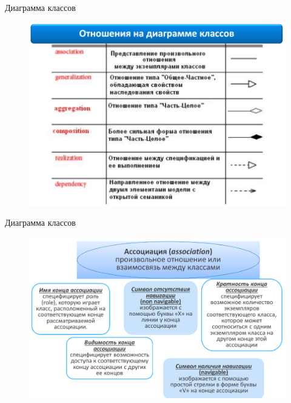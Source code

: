 \documentclass{beamer}
\begin{document}
\begin{frame}[t]{Диаграмма классов}
\begin{figure}[h]
\centering
\includegraphics[scale=0.45]{images/lec03-pic23.png}
\end{figure}
\end{frame}

\begin{frame}[t]{Диаграмма классов}
\begin{figure}[h]
\centering
\includegraphics[scale=0.45]{images/lec03-pic24.png}
\end{figure}
\end{frame}
\end{document}
